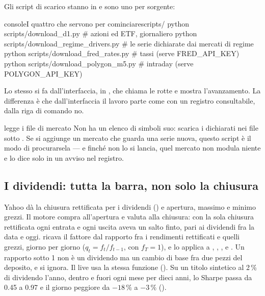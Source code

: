 Gli script di scarico stanno in  e sono uno per sorgente:

\begin{codiceInterno}{console}{I quattro che servono per cominciare}{scripts/}
python scripts/download_d1.py              # azioni ed ETF, giornaliero
python scripts/download_regime_drivers.py  # le serie dichiarate dai mercati di regime
python scripts/download_fred_rates.py      # tassi (serve FRED_API_KEY)
python scripts/download_polygon_m5.py      # intraday (serve POLYGON_API_KEY)
\end{codiceInterno}

\noindent
Lo stesso si fa dall'interfaccia, in , che chiama le rotte
 e mostra l'avanzamento. La differenza è
che dall'interfaccia il lavoro parte come  con un registro
consultabile, dalla riga di comando no.

\begin{attenzione}{ legge i file di mercato}
Non ha un elenco di simboli suo: scarica i  dichiarati nei file
sotto . Se si aggiunge un mercato che guarda una serie
nuova, questo script è il modo di procurarsela --- e finché non lo si lancia,
quel mercato non modula niente e lo dice solo in un avviso nel registro.
\end{attenzione}

\subsection{I dividendi: tutta la barra, non solo la chiusura}\label{sez:dividendi}

Yahoo dà la chiusura rettificata per i dividendi () e
apertura, massimo e minimo grezzi. Il motore compra all'apertura e valuta
alla chiusura: con la sola chiusura rettificata ogni entrata e ogni uscita
aveva un salto finto, pari ai dividendi fra la data e oggi.
 ricava il fattore dal rapporto fra i
rendimenti rettificati e quelli grezzi, giorno per giorno ($q_t =
f_t/f_{t-1}$, con $f_T = 1$), e lo applica a , ,
,  e . Un rapporto sotto \num{1} non è un
dividendo ma un cambio di base fra due pezzi del deposito, e si ignora. Il
live usa la stessa funzione (). Su un titolo
sintetico al \num{2}\,\% di dividendo l'anno, dentro e fuori ogni mese per
dieci anni, lo Sharpe passa da \num{0.45} a \num{0.97} e il giorno
peggiore da $-18\,\%$ a $-3\,\%$ ().

